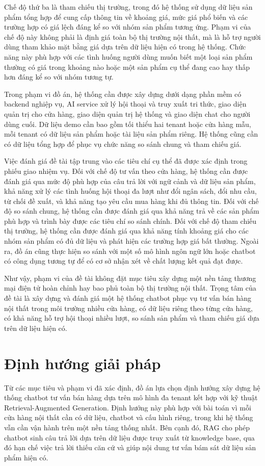 \documentclass[../DoAn.tex]{subfiles}
\begin{document}
Chế độ thứ ba là tham chiếu thị trường, trong đó hệ thống sử dụng dữ liệu sản phẩm tổng hợp để cung cấp thông tin về khoảng giá, mức giá phổ biến và các trường hợp có giá lệch đáng kể so với nhóm sản phẩm tương ứng. Phạm vi của chế độ này không phải là định giá toàn bộ thị trường nội thất, mà là hỗ trợ người dùng tham khảo mặt bằng giá dựa trên dữ liệu hiện có trong hệ thống. Chức năng này phù hợp với các tình huống người dùng muốn biết một loại sản phẩm thường có giá trong khoảng nào hoặc một sản phẩm cụ thể đang cao hay thấp hơn đáng kể so với nhóm tương tự.

Trong phạm vi đồ án, hệ thống cần được xây dựng dưới dạng phần mềm có backend nghiệp vụ, AI service xử lý hội thoại và truy xuất tri thức, giao diện quản trị cho cửa hàng, giao diện quản trị hệ thống và giao diện chat cho người dùng cuối. Dữ liệu demo cần bao gồm tối thiểu hai tenant hoặc cửa hàng mẫu, mỗi tenant có dữ liệu sản phẩm hoặc tài liệu sản phẩm riêng. Hệ thống cũng cần có dữ liệu tổng hợp để phục vụ chức năng so sánh chung và tham chiếu giá.

Việc đánh giá đề tài tập trung vào các tiêu chí cụ thể đã được xác định trong phiếu giao nhiệm vụ. Đối với chế độ tư vấn theo cửa hàng, hệ thống cần được đánh giá qua mức độ phù hợp của câu trả lời với ngữ cảnh và dữ liệu sản phẩm, khả năng xử lý các tình huống hội thoại đa lượt như đổi ngân sách, đổi nhu cầu, từ chối đề xuất, và khả năng tạo yêu cầu mua hàng khi đủ thông tin. Đối với chế độ so sánh chung, hệ thống cần được đánh giá qua khả năng trả về các sản phẩm phù hợp và trình bày được các tiêu chí so sánh chính. Đối với chế độ tham chiếu thị trường, hệ thống cần được đánh giá qua khả năng tính khoảng giá cho các nhóm sản phẩm có đủ dữ liệu và phát hiện các trường hợp giá bất thường. Ngoài ra, đồ án cũng thực hiện so sánh với một số mô hình ngôn ngữ lớn hoặc chatbot có công dụng tương tự để có cơ sở nhận xét về chất lượng kết quả đạt được.

Như vậy, phạm vi của đề tài không đặt mục tiêu xây dựng một nền tảng thương mại điện tử hoàn chỉnh hay bao phủ toàn bộ thị trường nội thất. Trọng tâm của đề tài là xây dựng và đánh giá một hệ thống chatbot phục vụ tư vấn bán hàng nội thất trong môi trường nhiều cửa hàng, có dữ liệu riêng theo từng cửa hàng, có khả năng hỗ trợ hội thoại nhiều lượt, so sánh sản phẩm và tham chiếu giá dựa trên dữ liệu hiện có.

\section{Định hướng giải pháp}
\label{section:1.3}
Từ các mục tiêu và phạm vi đã xác định, đồ án lựa chọn định hướng xây dựng hệ thống chatbot tư vấn bán hàng dựa trên mô hình đa tenant kết hợp với kỹ thuật Retrieval-Augmented Generation. Định hướng này phù hợp với bài toán vì mỗi cửa hàng nội thất cần có dữ liệu, chatbot và cấu hình riêng, trong khi hệ thống vẫn cần vận hành trên một nền tảng thống nhất. Bên cạnh đó, RAG cho phép chatbot sinh câu trả lời dựa trên dữ liệu được truy xuất từ knowledge base, qua đó hạn chế việc trả lời thiếu căn cứ và giúp nội dung tư vấn bám sát dữ liệu sản phẩm hiện có.
\end{document}
